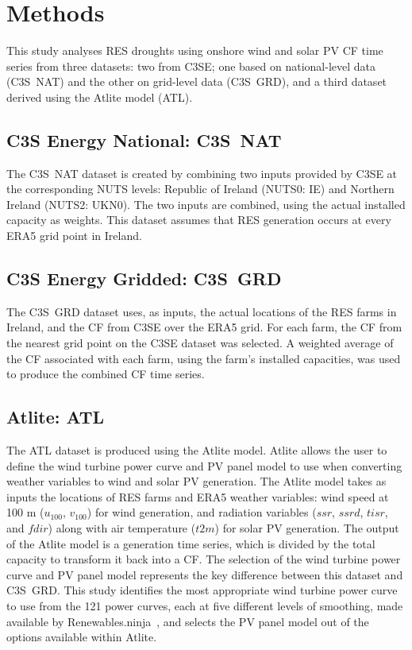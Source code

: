 \documentclass[preprint, 12pt]{elsarticle}
\begin{document}
\section{Methods}
\label{sec:methods}

This study analyses RES droughts using onshore wind and solar PV CF time series from three datasets: two from C3SE; one based on national-level data (C3S~NAT) and the other on grid-level data (C3S~GRD), and a third dataset derived using the Atlite model (ATL). 

\subsection{C3S Energy National: C3S~NAT}
\label{sec:c3se_n}

The C3S~NAT dataset is created by combining two inputs provided by C3SE at the corresponding NUTS levels: Republic of Ireland (NUTS0: IE) and Northern Ireland (NUTS2: UKN0). The two inputs are combined, using the actual installed capacity as weights. This dataset assumes that RES generation occurs at every ERA5 grid point in Ireland. 

\subsection{C3S Energy Gridded: C3S~GRD}
\label{sec:c3se_g}

The C3S~GRD dataset uses, as inputs, the actual locations of the RES farms in Ireland, and the CF from C3SE over the ERA5 grid. For each farm, the CF from the nearest grid point on the C3SE dataset was selected. A weighted average of the CF associated with each farm, using the farm's installed capacities, was used to produce the combined CF time series.

\subsection{Atlite: ATL} 
\label{sec:atlite}

The ATL dataset is produced using the Atlite model. Atlite allows the user to define the wind turbine power curve and PV panel model to use when converting weather variables to wind and solar PV generation. The Atlite model takes as inputs the locations of RES farms and ERA5 weather variables: wind speed at 100 m ($u_{100}$, $v_{100}$) for wind generation, and radiation variables ($ssr$, $ssrd$, $tisr$, and $fdir$) along with air temperature ($t2m$) for solar PV generation. The output of the Atlite model is a generation time series, which is divided by the total capacity to transform it back into a CF. The selection of the wind turbine power curve and PV panel model represents the key difference between this dataset and C3S~GRD. This study identifies the most appropriate wind turbine power curve to use from the 121 power curves, each at five different levels of smoothing, made available by Renewables.ninja~\citep{staffell2016wake}, and selects the PV panel model out of the options available within Atlite.
\end{document}
